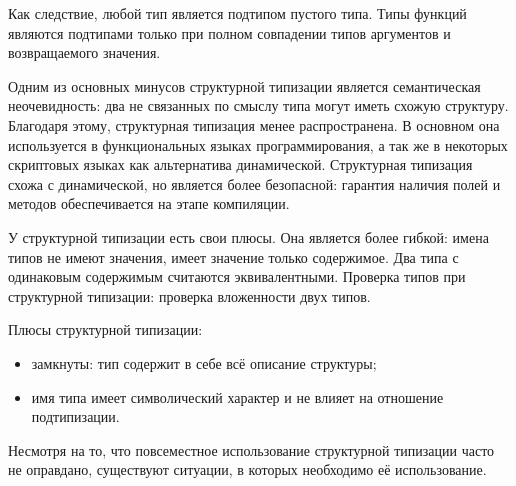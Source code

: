 Как следствие, любой тип является подтипом пустого типа. Типы функций являются подтипами только при полном совпадении типов аргументов и возвращаемого значения.

Одним из основных минусов структурной типизации является семантическая неочевидность: два не связанных по смыслу типа могут иметь схожую структуру. Благодаря этому, структурная типизация менее распространена. В основном она используется в функциональных языках программирования, а так же в некоторых скриптовых языках как альтернатива динамической. Структурная типизация схожа с динамической, но является более безопасной: гарантия наличия полей и методов обеспечивается на этапе компиляции.

У структурной типизации есть свои плюсы. Она является более гибкой: имена типов не имеют значения, имеет значение только содержимое. Два типа с одинаковым содержимым считаются эквивалентными. Проверка типов при структурной типизации: проверка вложенности двух типов.

Плюсы структурной типизации:
\begin{itemize}
    \item замкнуты: тип содержит в себе всё описание структуры;
    \item имя типа имеет символический характер и не влияет на отношение подтипизации.
\end{itemize}

Несмотря на то, что повсеместное использование структурной типизации часто не оправдано, существуют ситуации, в которых необходимо её использование.
